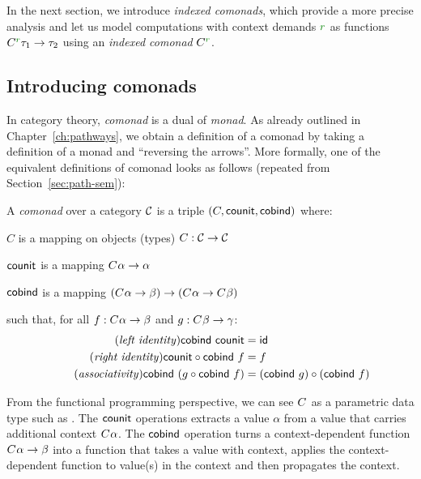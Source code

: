 In the next section, we introduce \emph{indexed comonads}, which provide a more precise analysis
and let us model computations with context demands $\cclrd{r}$ as functions
$\ctyp{\cclrd{r}}{\tau_1} \rightarrow \tau_2$ using an \emph{indexed comonad} $\ctyp{\cclrd{r}}{}$.


\subsection{Introducing comonads}

In category theory, \emph{comonad} is a dual of \emph{monad}. As already outlined in
Chapter~\ref{ch:pathways}, we obtain a definition of a comonad by taking a definition of a monad
and ``reversing the arrows''. More formally, one of the equivalent definitions of comonad
looks as follows (repeated from Section~\ref{sec:path-sem}):

\begin{definition}
A \emph{comonad} over a category $\mathcal{C}$ is a triple $(C, \textnormal{\sffamily counit}, \textnormal{\sffamily cobind})$ where:
\begin{compactitem}
\item $C$ is a mapping on objects (types) $C : \mathcal{C} \rightarrow \mathcal{C}$
\item $\textnormal{\sffamily counit}$ is a mapping $C^{}\alpha \rightarrow \alpha$
\item $\textnormal{\sffamily cobind}$ is a mapping $(C^{}\alpha \rightarrow \beta)
  \rightarrow (C^{}\alpha \rightarrow C^{}\beta)$
\end{compactitem}
such that, for all $f:C^{}\alpha \rightarrow \beta$ and $g:C^{}\beta \rightarrow \gamma$:
\begin{align}
\tag{\emph{left identity}}
  \ident{cobind}~\ident{counit} &= \idf{}
  \\
\tag{\emph{right identity}}
  \ident{counit} \circ \ident{cobind}~f &= f
  \\
\tag{\emph{associativity}}
  \ident{cobind}~(g \circ \ident{cobind}~f) &= (\ident{cobind}~g) \circ (\ident{cobind}~f)
\end{align}
\end{definition}

\noindent
From the functional programming perspective, we can see $C^{}$ as a parametric data type such as
. The $\textnormal{\sffamily counit}$ operations extracts a value $\alpha$ from a value that carries
additional context $C^{}\alpha$. The $\textnormal{\sffamily cobind}$ operation turns a context-dependent function
$C^{}\alpha \rightarrow \beta$ into a function that takes a value with context, applies
the context-dependent function to value(s) in the context and then propagates the context.

